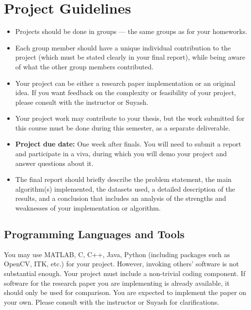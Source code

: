 \documentclass[11pt]{article}
\begin{document}
\maketitle

\section*{Project Guidelines}
\begin{itemize}
    \item Projects should be done in groups — the same groups as for your homeworks.
    \item Each group member should have a unique individual contribution to the project (which must be stated clearly in your final report), while being aware of what the other group members contributed.
    \item Your project can be either a research paper implementation or an original idea. If you want feedback on the complexity or feasibility of your project, please consult with the instructor or Suyash.
    \item Your project work may contribute to your thesis, but the work submitted for this course must be done during this semester, as a separate deliverable.
    \item \textbf{Project due date:} One week after finals. You will need to submit a report and participate in a viva, during which you will demo your project and answer questions about it.
    \item The final report should briefly describe the problem statement, the main algorithm(s) implemented, the datasets used, a detailed description of the results, and a conclusion that includes an analysis of the strengths and weaknesses of your implementation or algorithm.
\end{itemize}

\subsection*{Programming Languages and Tools}

You may use MATLAB, C, C++, Java, Python (including packages such as OpenCV, ITK, etc.) for your project. However, invoking others' software is not substantial enough. Your project must include a non-trivial coding component. If software for the research paper you are implementing is already available, it should only be used for comparison. You are expected to implement the paper on your own. Please consult with the instructor or Suyash for clarifications.
\end{document}
